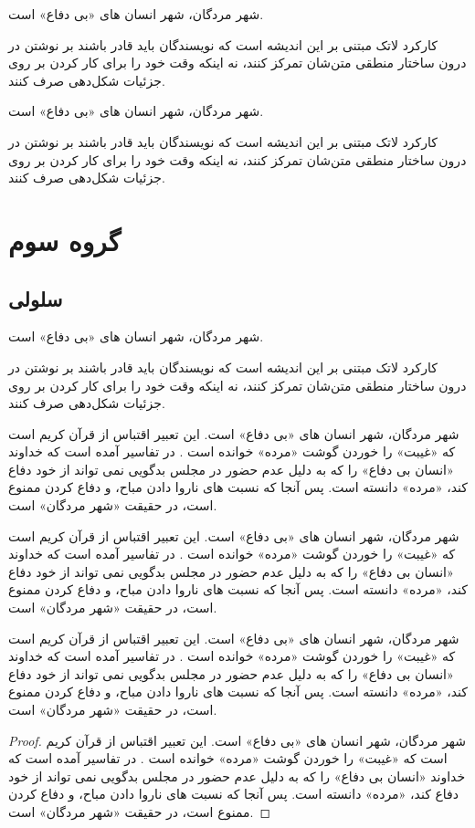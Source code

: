\documentclass{report}
\begin{document}
\begin{ntpoint}
شهر مردگان، شهر انسان های «بی دفاع» است. 
\end{ntpoint}
کارکرد لاتک مبتنی بر این اندیشه است که نویسندگان باید قادر باشند بر نوشتن در درون ساختار منطقی متن‌شان تمرکز کنند، نه اینکه وقت خود را برای کار کردن بر روی جزئیات شکل‌دهی صرف کنند. 
\begin{ntpoint}
شهر مردگان، شهر انسان های «بی دفاع» است. 
\end{ntpoint}
کارکرد لاتک مبتنی بر این اندیشه است که نویسندگان باید قادر باشند بر نوشتن در درون ساختار منطقی متن‌شان تمرکز کنند، نه اینکه وقت خود را برای کار کردن بر روی جزئیات شکل‌دهی صرف کنند. 
\chapter{گروه سوم}
\section{سلولی}
\begin{ntdefinition}
شهر مردگان، شهر انسان های «بی دفاع» است. 
\end{ntdefinition}
کارکرد لاتک مبتنی بر این اندیشه است که نویسندگان باید قادر باشند بر نوشتن در درون ساختار منطقی متن‌شان تمرکز کنند، نه اینکه وقت خود را برای کار کردن بر روی جزئیات شکل‌دهی صرف کنند. 
\begin{ntsolution}
شهر مردگان، شهر انسان های «بی دفاع» است. این تعبیر اقتباس از قرآن کریم است که «غیبت» را خوردن گوشت «مرده» خوانده است . در تفاسیر آمده است که خداوند «انسان بی دفاع» را که به دلیل عدم حضور در مجلس بدگویی نمی تواند از خود دفاع کند، «مرده» دانسته است. پس آنجا که نسبت های ناروا دادن مباح، و دفاع کردن ممنوع است، در حقیقت «شهر مردگان» است.
\end{ntsolution}
\begin{nttheorem}
شهر مردگان، شهر انسان های «بی دفاع» است. این تعبیر اقتباس از قرآن کریم است که «غیبت» را خوردن گوشت «مرده» خوانده است . در تفاسیر آمده است که خداوند «انسان بی دفاع» را که به دلیل عدم حضور در مجلس بدگویی نمی تواند از خود دفاع کند، «مرده» دانسته است. پس آنجا که نسبت های ناروا دادن مباح، و دفاع کردن ممنوع است، در حقیقت «شهر مردگان» است.
\end{nttheorem}
\begin{nttheorem}
شهر مردگان، شهر انسان های «بی دفاع» است. این تعبیر اقتباس از قرآن کریم است که «غیبت» را خوردن گوشت «مرده» خوانده است . در تفاسیر آمده است که خداوند «انسان بی دفاع» را که به دلیل عدم حضور در مجلس بدگویی نمی تواند از خود دفاع کند، «مرده» دانسته است. پس آنجا که نسبت های ناروا دادن مباح، و دفاع کردن ممنوع است، در حقیقت «شهر مردگان» است.
\end{nttheorem}
\begin{proof}
شهر مردگان، شهر انسان های «بی دفاع» است. این تعبیر اقتباس از قرآن کریم است که «غیبت» را خوردن گوشت «مرده» خوانده است . در تفاسیر آمده است که خداوند «انسان بی دفاع» را که به دلیل عدم حضور در مجلس بدگویی نمی تواند از خود دفاع کند، «مرده» دانسته است. پس آنجا که نسبت های ناروا دادن مباح، و دفاع کردن ممنوع است، در حقیقت «شهر مردگان» است.
\end{proof}
\end{document}
